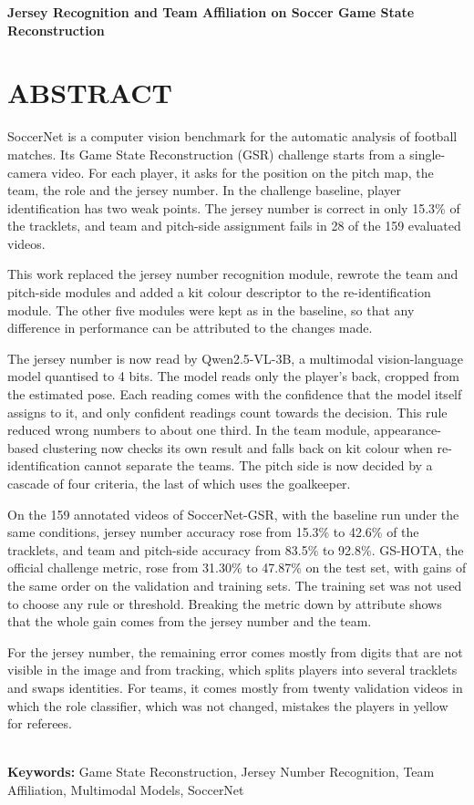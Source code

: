 \begingroup
\begin{flushleft}
\bfseries
{}
{\Large
Jersey Recognition and Team Affiliation on Soccer Game State Reconstruction}

\mdseries
\end{flushleft}
\normalsize
\let\clearpage\relax
\chapter{ABSTRACT}
\endgroup

\noindent SoccerNet is a computer vision benchmark for the automatic analysis of football matches. Its Game State Reconstruction (GSR) challenge starts from a single-camera video. For each player, it asks for the position on the pitch map, the team, the role and the jersey number. In the challenge baseline, player identification has two weak points. The jersey number is correct in only 15.3\% of the tracklets, and team and pitch-side assignment fails in 28 of the 159 evaluated videos.

This work replaced the jersey number recognition module, rewrote the team and pitch-side modules and added a kit colour descriptor to the re-identification module. The other five modules were kept as in the baseline, so that any difference in performance can be attributed to the changes made.

The jersey number is now read by Qwen2.5-VL-3B, a multimodal vision-language model quantised to 4 bits. The model reads only the player's back, cropped from the estimated pose. Each reading comes with the confidence that the model itself assigns to it, and only confident readings count towards the decision. This rule reduced wrong numbers to about one third. In the team module, appearance-based clustering now checks its own result and falls back on kit colour when re-identification cannot separate the teams. The pitch side is now decided by a cascade of four criteria, the last of which uses the goalkeeper.

On the 159 annotated videos of SoccerNet-GSR, with the baseline run under the same conditions, jersey number accuracy rose from 15.3\% to 42.6\% of the tracklets, and team and pitch-side accuracy from 83.5\% to 92.8\%. GS-HOTA, the official challenge metric, rose from 31.30\% to 47.87\% on the test set, with gains of the same order on the validation and training sets. The training set was not used to choose any rule or threshold. Breaking the metric down by attribute shows that the whole gain comes from the jersey number and the team.

For the jersey number, the remaining error comes mostly from digits that are not visible in the image and from tracking, which splits players into several tracklets and swaps identities. For teams, it comes mostly from twenty validation videos in which the role classifier, which was not changed, mistakes the players in yellow for referees.


\hspace{3cm}\\
\indent
\textbf{Keywords: } Game State Reconstruction, Jersey Number Recognition, Team Affiliation, Multimodal Models, SoccerNet
